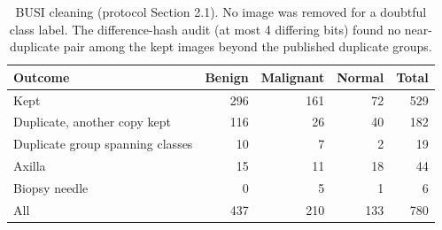 \begin{table}[!ht]
\centering
\caption{BUSI cleaning (protocol Section 2.1). No image was removed for a doubtful class label. The difference-hash audit (at most 4 differing bits) found no near-duplicate pair among the kept images beyond the published duplicate groups.}\label{stab:busiflow}
\footnotesize
\begin{tabular}{@{}lrrrr@{}}
\toprule
Outcome & Benign & Malignant & Normal & Total \\
\midrule
Kept & 296 & 161 & 72 & 529 \\
Duplicate, another copy kept & 116 & 26 & 40 & 182 \\
Duplicate group spanning classes & 10 & 7 & 2 & 19 \\
Axilla & 15 & 11 & 18 & 44 \\
Biopsy needle & 0 & 5 & 1 & 6 \\
\midrule
All & 437 & 210 & 133 & 780 \\
\bottomrule
\end{tabular}
\end{table}
